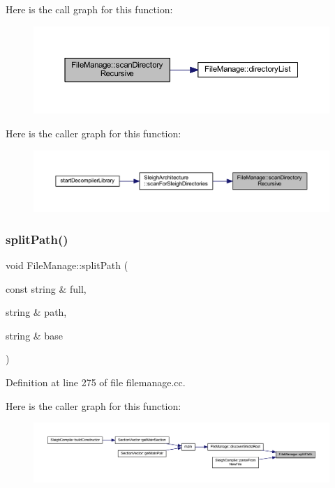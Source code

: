 Here is the call graph for this function\+:
\nopagebreak
\begin{figure}[H]
\begin{center}
\leavevmode
\includegraphics[width=350pt]{class_file_manage_ab6197b51380f92ab7cd595edc96efb47_cgraph}
\end{center}
\end{figure}
Here is the caller graph for this function\+:
\nopagebreak
\begin{figure}[H]
\begin{center}
\leavevmode
\includegraphics[width=350pt]{class_file_manage_ab6197b51380f92ab7cd595edc96efb47_icgraph}
\end{center}
\end{figure}
\mbox{\label{class_file_manage_a7c7130f99f99539159c25e94d6b3ea15}} 
\subsubsection{\texorpdfstring{splitPath()}{splitPath()}}
{\footnotesize\ttfamily void File\+Manage\+::split\+Path (\begin{DoxyParamCaption}\item[{const string \&}]{full,  }\item[{string \&}]{path,  }\item[{string \&}]{base }\end{DoxyParamCaption})\hspace{0.3cm}{\ttfamily [static]}}



Definition at line 275 of file filemanage.\+cc.

Here is the caller graph for this function\+:
\nopagebreak
\begin{figure}[H]
\begin{center}
\leavevmode
\includegraphics[width=350pt]{class_file_manage_a7c7130f99f99539159c25e94d6b3ea15_icgraph}
\end{center}
\end{figure}


